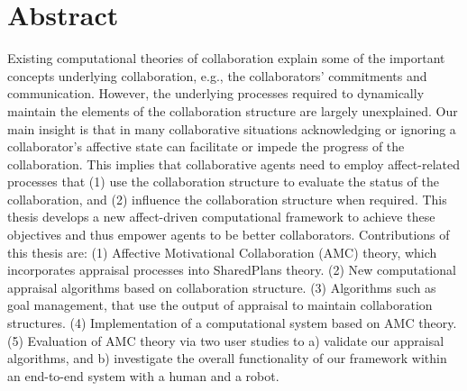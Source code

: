 \documentclass[12pt]{report}
\begin{document}

\chapter*{Abstract}
Existing computational theories of collaboration explain some of the important
concepts underlying collaboration, e.g., the collaborators' commitments and
communication. However, the underlying processes required to dynamically
maintain the elements of the collaboration structure are largely unexplained.
Our main insight is that in many collaborative situations acknowledging or
ignoring a collaborator's affective state can facilitate or impede the progress
of the collaboration. This implies that collaborative agents need to employ
affect-related processes that (1) use the collaboration structure to evaluate
the status of the collaboration, and (2) influence the collaboration structure
when required. This thesis develops a new affect-driven computational framework
to achieve these objectives and thus empower agents to be better collaborators.
Contributions of this thesis are: (1) Affective Motivational Collaboration (AMC)
theory, which incorporates appraisal processes into SharedPlans theory. (2) New
computational appraisal algorithms based on collaboration structure. (3)
Algorithms such as goal management, that use the output of appraisal to maintain
collaboration structures. (4) Implementation of a computational system based on
AMC theory. (5) Evaluation of AMC theory via two user studies to a) validate our
appraisal algorithms, and b) investigate the overall functionality of our
framework within an end-to-end system with a human and a robot.

\pagebreak
\end{document}
